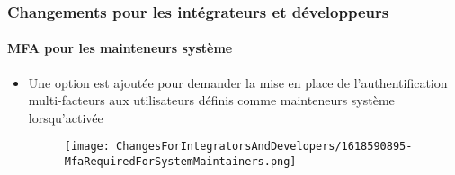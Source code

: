 %

\begin{frame}[fragile]
	\frametitle{Changements pour les intégrateurs et développeurs}
	\framesubtitle{MFA pour les mainteneurs système}


	\begin{itemize}
		\item Une option est ajoutée pour demander la mise en place de l'authentification multi-facteurs aux
		    utilisateurs définis comme mainteneurs système lorsqu'activée
		\vspace{0.4cm}
		\begin{figure}
			\texttt{[image: ChangesForIntegratorsAndDevelopers/1618590895-MfaRequiredForSystemMaintainers.png]}
		\end{figure}
	\end{itemize}
\end{frame}

